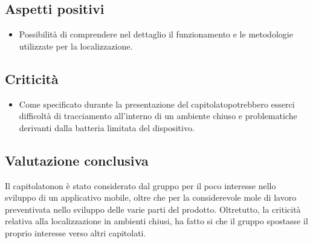 \subsection{Aspetti positivi}
\begin{itemize}
	\item Possibilità di comprendere nel dettaglio il funzionamento e le metodologie utilizzate per la localizzazione.
\end{itemize}
\subsection{Criticità}
\begin{itemize}
	\item Come specificato durante la presentazione del capitolato\glo potrebbero esserci difficoltà di tracciamento all'interno di un ambiente chiuso e problematiche derivanti dalla batteria limitata del dispositivo.
\end{itemize}
\subsection{Valutazione conclusiva}
Il capitolato\glo non è stato considerato dal gruppo per il poco interesse nello sviluppo di un applicativo mobile, oltre che per la considerevole mole di lavoro preventivata nello sviluppo delle varie parti del prodotto. Oltretutto, la criticità relativa alla localizzazione in ambienti chiusi, ha fatto si che il gruppo spostasse il proprio interesse verso altri capitolati.
